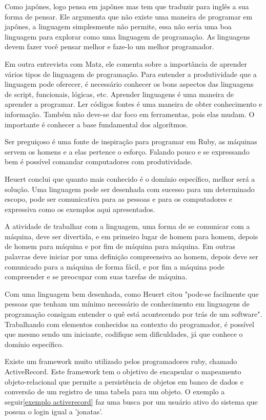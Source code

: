 \documentclass[espaco=simples,appendix=Name]{abnt}
\begin{document}
Como japônes, logo pensa em japônes mas tem que traduzir para inglês a sua forma de pensar. Ele argumenta que não existe uma maneira de programar em japônes, a linguagem simplesmente não permite, essa não seria uma boa linguagem para explorar como uma linguagem de programação. As linguagens devem fazer você pensar melhor e faze-lo um melhor programador.\cite{programmingRuby}


Em outra entrevista \cite{entrevistaDivertidaComMatz} com Matz, ele comenta sobre a importância de aprender vários tipos de linguagem de programação. Para entender a produtividade que a linguagem pode oferecer, é necessário conhecer os bons aspectos das linguagens de script, funcionais, lógicas, etc. Aprender linguagens é uma maneira de aprender a programar. Ler códigos fontes é uma maneira de obter conhecimento e informação. Também não deve-se dar foco em ferramentas, pois elas mudam. O importante é conhecer a base fundamental dos algorítmos.

Ser preguiçoso é uma fonte de inspiração para programar em Ruby, as máquinas servem os homens e a elas pertence o esforço. Falando pouco e se expressando bem é possível comandar computadores com produtividade.

Heuert\cite{dslLeandro} conclui que quanto mais conhecido é o domínio específico, melhor será a solução. Uma linguagem pode ser desenhada com sucesso para um determinado escopo, pode ser comunicativa para as pessoas e para os computadores e expressiva como os exemplos aqui apresentados.

A atividade de trabalhar com a linguagem, uma forma de se comunicar com a máquina, deve ser divertida, e em primeiro lugar de homem para homem, depois de homem para máquina e por fim de máquina para máquina\cite{entrevistaDivertidaComMatz}. Em outras palavras deve iniciar por uma definição compreensiva ao homem, depois deve ser comunicado para a máquina de forma fácil, e por fim a máquina pode compreender e se preocupar com suas tarefas de máquina.


Com uma linguagem bem desenhada, como Heuert citou "pode-se facilmente que pessoas que tenham um mínimo necessário de conhecimento em linguagens de programação consigam entender o quê está acontecendo por trás de um software"\cite{dslLeandro}. Trabalhando com elementos conhecidos na contexto do programador, é possível que mesmo sendo um iniciante, codifique sem dificuldades, já que conhece o domínio específico.

Existe um framework muito utilizado pelos programadores ruby, chamado ActiveRecord. Este framework tem o objetivo de encapsular o mapeamento objeto-relacional que permite a persistência de objetos em banco de dados e conversão de um registro de uma tabela para um objeto. O exemplo a seguir\ref{exemplo activerecord} faz uma busca por um usuário ativo do sistema que possua o login igual a 'jonatas'.
\end{document}
